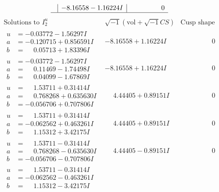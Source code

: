 \documentclass[1p]{elsarticle_modified}
\theoremstyle{definition}
\newcommand{\I}{\sqrt{-1}}
\begin{document}
$$\begin{array}{c|c|c}
 & -8.16558 - 1.16224 I & \phantom{-0.000000 } 0\\
 \hline 
 \end{array}$$\newpage$$\begin{array}{c|c|c}  
\text{Solutions to }I^u_{2}& \I (\text{vol} + \sqrt{-1}CS) & \text{Cusp shape}\\
 \hline 
\begin{aligned}
u &= -0.03772 - 1.56297 I \\
a &= -0.120715 + 0.856591 I \\
b &= \phantom{-}0.05713 + 1.83396 I\end{aligned}
 & -8.16558 + 1.16224 I & \phantom{-0.000000 } 0 \\ \hline\begin{aligned}
u &= -0.03772 - 1.56297 I \\
a &= \phantom{-}0.11469 - 1.74498 I \\
b &= \phantom{-}0.04099 - 1.67869 I\end{aligned}
 & -8.16558 + 1.16224 I & \phantom{-0.000000 } 0 \\ \hline\begin{aligned}
u &= \phantom{-}1.53711 + 0.31414 I \\
a &= \phantom{-}0.768268 + 0.635630 I \\
b &= -0.056706 + 0.707806 I\end{aligned}
 & \phantom{-}4.44405 + 0.89151 I & \phantom{-0.000000 } 0 \\ \hline\begin{aligned}
u &= \phantom{-}1.53711 + 0.31414 I \\
a &= -0.062562 + 0.463261 I \\
b &= \phantom{-}1.15312 + 3.42175 I\end{aligned}
 & \phantom{-}4.44405 + 0.89151 I & \phantom{-0.000000 } 0 \\ \hline\begin{aligned}
u &= \phantom{-}1.53711 - 0.31414 I \\
a &= \phantom{-}0.768268 - 0.635630 I \\
b &= -0.056706 - 0.707806 I\end{aligned}
 & \phantom{-}4.44405 - 0.89151 I & \phantom{-0.000000 } 0 \\ \hline\begin{aligned}
u &= \phantom{-}1.53711 - 0.31414 I \\
a &= -0.062562 - 0.463261 I \\
b &= \phantom{-}1.15312 - 3.42175 I\end{aligned}

\end{array}$$
\end{document}
